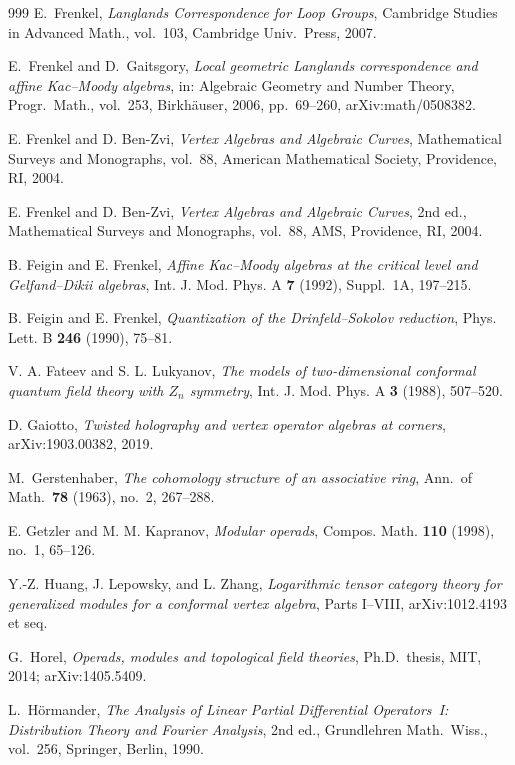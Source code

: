 \documentclass[11pt]{memoir}
\begin{document}
\begin{thebibliography}{999}
E.~Frenkel, \emph{Langlands Correspondence for Loop Groups}, Cambridge Studies in Advanced Math., vol.~103, Cambridge Univ.\ Press, 2007.

E.~Frenkel and D.~Gaitsgory, \emph{Local geometric Langlands correspondence and affine Kac--Moody algebras}, in: Algebraic Geometry and Number Theory, Progr.\ Math., vol.~253, Birkh\"auser, 2006, pp.~69--260, arXiv:math/0508382.

E. Frenkel and D. Ben-Zvi, \emph{Vertex Algebras and Algebraic Curves}, Mathematical Surveys and Monographs, vol.~88, American Mathematical Society, Providence, RI, 2004.

E. Frenkel and D. Ben-Zvi, \emph{Vertex Algebras and Algebraic Curves}, 2nd ed., Mathematical Surveys and Monographs, vol.~88, AMS, Providence, RI, 2004.

B. Feigin and E. Frenkel, \emph{Affine Kac--Moody algebras at the critical level and Gelfand--Dikii algebras}, Int. J. Mod. Phys. A \textbf{7} (1992), Suppl.~1A, 197--215.

B. Feigin and E. Frenkel, \emph{Quantization of the Drinfeld--Sokolov reduction}, Phys. Lett. B \textbf{246} (1990), 75--81.

V. A. Fateev and S. L. Lukyanov, \emph{The models of two-dimensional conformal quantum field theory with $Z_n$ symmetry}, Int. J. Mod. Phys. A \textbf{3} (1988), 507--520.

D. Gaiotto, \emph{Twisted holography and vertex operator algebras at corners}, arXiv:1903.00382, 2019.

 M.~Gerstenhaber, \emph{The cohomology structure of an associative ring}, Ann.\ of Math.\ \textbf{78} (1963), no.~2, 267--288.

E. Getzler and M. M. Kapranov, \emph{Modular operads}, Compos. Math. \textbf{110} (1998), no.~1, 65--126.

Y.-Z. Huang, J. Lepowsky, and L. Zhang, \emph{Logarithmic tensor category theory for generalized modules for a conformal vertex algebra}, Parts I--VIII, arXiv:1012.4193 et seq.

 G.~Horel, \emph{Operads, modules and topological field theories}, Ph.D.\ thesis, MIT, 2014; arXiv:1405.5409.

L.~H\"ormander, \emph{The Analysis of Linear Partial Differential Operators~I: Distribution Theory and Fourier Analysis}, 2nd ed., Grundlehren Math.\ Wiss., vol.~256, Springer, Berlin, 1990.


\end{thebibliography}
\end{document}
